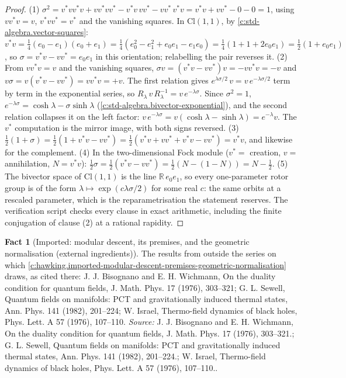 \documentclass[11pt]{article}
\theoremstyle{definition}
\newtheorem{fact}[theorem]{Fact}
\theoremstyle{plain}
\providecommand{\Cl}{}\renewcommand{\Cl}{\mathrm{Cl}}
\providecommand{\R}{}\renewcommand{\R}{\mathbb{R}}
\begin{document}
\begin{proof}
(1) $\sigma^2 = v^*vv^*v + vv^*vv^* - v^*v\,vv^* - vv^*\,v^*v = v^*v + vv^* - 0 - 0 = 1$, using $vv^*v = v$, $v^*vv^* = v^*$ and the vanishing squares. In $\Cl(1,1)$, by \ref{c:std-algebra.vector-squares}: $v^*v = \tfrac14(e_0 - e_1)(e_0 + e_1) = \tfrac14(e_0^2 - e_1^2 + e_0e_1 - e_1e_0) = \tfrac14(1 + 1 + 2e_0e_1) = \tfrac12(1 + e_0e_1)$, so $\sigma = v^*v - vv^* = e_0e_1$ in this orientation; relabelling the pair reverses it. (2) From $vv^*v = v$ and the vanishing squares, $\sigma v = (v^*v - vv^*)v = -vv^*v = -v$ and $v\sigma = v(v^*v - vv^*) = vv^*v = +v$. The first relation gives $e^{\lambda\sigma/2}\,v = v\,e^{-\lambda\sigma/2}$ term by term in the exponential series, so $R_\lambda\, v\, R_\lambda^{-1} = v\,e^{-\lambda\sigma}$. Since $\sigma^2 = 1$, $e^{-\lambda\sigma} = \cosh\lambda - \sigma\sinh\lambda$ (\ref{c:std-algebra.bivector-exponential}), and the second relation collapses it on the left factor: $v\,e^{-\lambda\sigma} = v(\cosh\lambda - \sinh\lambda) = e^{-\lambda}v$. The $v^*$ computation is the mirror image, with both signs reversed. (3) $\tfrac12(1 + \sigma) = \tfrac12(1 + v^*v - vv^*) = \tfrac12(v^*v + vv^* + v^*v - vv^*) = v^*v$, and likewise for the complement. (4) In the two-dimensional Fock module ($v^* = $ creation, $v = $ annihilation, $N = v^*v$): $\tfrac12\sigma = \tfrac12(v^*v - vv^*) = \tfrac12(N - (1 - N)) = N - \tfrac12$. (5) The bivector space of $\Cl(1,1)$ is the line $\R\,e_0e_1$, so every one-parameter rotor group is of the form $\lambda \mapsto \exp(c\lambda\sigma/2)$ for some real $c$: the same orbits at a rescaled parameter, which is the reparametrisation the statement reserves. The verification script checks every clause in exact arithmetic, including the finite conjugation of clause (2) at a rational rapidity.

\end{proof}

\begin{fact}[Imported: modular descent, its premises, and the geometric normalisation (external ingredients)]\label{c:hawking.imported-modular-descent-premises-geometric-normalisation-external}
The results from outside the series on which \ref{c:hawking.imported-modular-descent-premises-geometric-normalisation} draws, as cited there: J. J. Bisognano and E. H. Wichmann, On the duality condition for quantum fields, J. Math. Phys. 17 (1976), 303--321; G. L. Sewell, Quantum fields on manifolds: PCT and gravitationally induced thermal states, Ann. Phys. 141 (1982), 201--224; W. Israel, Thermo-field dynamics of black holes, Phys. Lett. A 57 (1976), 107--110.
\emph{Source:} J. J. Bisognano and E. H. Wichmann, On the duality condition for quantum fields, J. Math. Phys. 17 (1976), 303--321.; G. L. Sewell, Quantum fields on manifolds: PCT and gravitationally induced thermal states, Ann. Phys. 141 (1982), 201--224.; W. Israel, Thermo-field dynamics of black holes, Phys. Lett. A 57 (1976), 107--110..
\end{fact}
\end{document}
